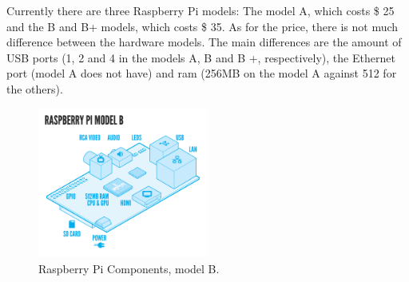 \documentclass{acm_proc_article-sp}
\begin{document}
\newline
\newline
Currently there are three  Raspberry Pi models: The model A, which costs \$ 25 and the B and B+ models, which costs \$ 35. As for the price, there is not much difference between the hardware models. The main differences are the amount of USB ports (1, 2 and 4 in the models A, B and B +, respectively), the Ethernet port (model A does not have) and ram (256MB on the model A against 512 for the others).
\begin{figure}[h]
\centering
    \includegraphics[width=0.5\textwidth,natwidth=610,natheight=642]{pictures/RaspiModelB.png}
    \caption{Raspberry Pi Components, model B. \protect\cite{raspberryFaq}}
    \label{fig:raspi}
\end{figure}
\end{document}
